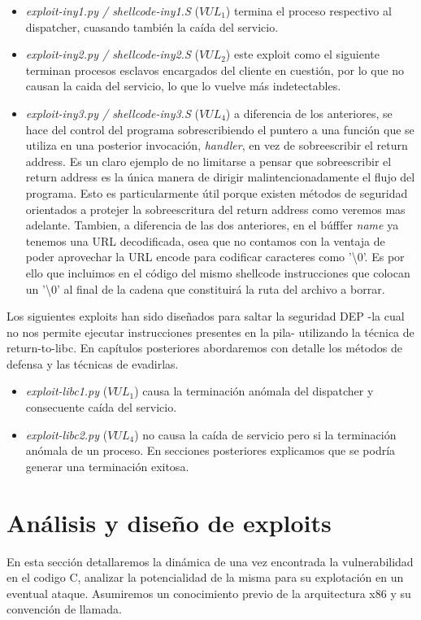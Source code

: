 \documentclass[12pt]{article}
\begin{document}
\begin{itemize}
\item  \textit{exploit-iny1.py / shellcode-iny1.S} ($VUL_1$) termina el proceso respectivo al dispatcher, cuasando también la caída del servicio.
\item  \textit{exploit-iny2.py / shellcode-iny2.S} ($VUL_2$) este exploit como el siguiente terminan procesos esclavos encargados del cliente en cuestión, por lo que no causan la caida del servicio, lo que lo vuelve más indetectables.
\item  \textit{exploit-iny3.py / shellcode-iny3.S} ($VUL_4$) a diferencia de los anteriores, se hace del control del programa sobrescribiendo el puntero a una función que se utiliza en una posterior invocación, \textit{handler}, en vez de sobreescribir el return address. Es un claro ejemplo de no limitarse a pensar que sobreescribir el return address es la única manera de dirigir malintencionadamente el flujo del programa. Esto es particularmente útil porque existen métodos de seguridad orientados a protejer la sobreescritura del return address como veremos mas adelante. Tambien, a diferencia de las dos anteriores, en el búfffer \textit{name} ya tenemos una URL decodificada, osea que no contamos con la ventaja de poder aprovechar la URL encode para codificar caracteres como '\textbackslash 0'. Es por ello que incluimos en el código del mismo shellcode instrucciones que colocan un '\textbackslash 0' al final de la cadena que constituirá la ruta del archivo a borrar.
\end{itemize}


Los siguientes exploits han sido diseñados para saltar la seguridad DEP -la cual no nos permite ejecutar instrucciones presentes en la pila- utilizando la técnica de return-to-libc. En capítulos posteriores abordaremos con detalle los métodos de defensa y las técnicas de evadirlas.
\begin{itemize}
\item \textit{exploit-libc1.py} ($VUL_1$) causa la terminación anómala del dispatcher y consecuente caída del servicio. 
\item \textit{exploit-libc2.py} ($VUL_4$) no causa la caída de servicio pero si la terminación anómala de un proceso. En secciones posteriores explicamos que se podría generar una terminación exitosa.
\end{itemize}


\section{Análisis y diseño de exploits}
En esta sección detallaremos la dinámica de una vez encontrada la vulnerabilidad en el codigo C, analizar la potencialidad de la misma para su explotación en un eventual ataque. Asumiremos un conocimiento previo de la arquitectura x86 y su convención de llamada.  \\
\end{document}
